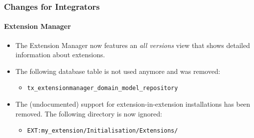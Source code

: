 %

\begin{frame}[fragile]
	\frametitle{Changes for Integrators}
	\framesubtitle{Extension Manager}

	\begin{itemize}
		\item The Extension Manager now features an \textit{all versions} view
			that shows detailed information about extensions.
		\item The following database table is not used anymore and was removed:
			\begin{itemize}\small
				\item \texttt{tx\_extensionmanager\_domain\_model\_repository}
			\end{itemize}\normalsize
			\vspace{0.2cm}

		\item The (undocumented) support for extension-in-extension installations
			has been removed. The following directory is now ignored:
			\begin{itemize}\small
				\item \texttt{EXT:my\_extension/Initialisation/Extensions/}
			\end{itemize}
			\vspace{0.2cm}
	\end{itemize}

\end{frame}

